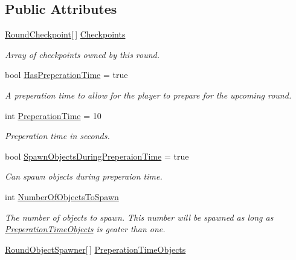 \subsection*{Public Attributes}
\begin{DoxyCompactItemize}
\item 
\hyperlink{class_round_manager_1_1_round_checkpoint}{Round\+Checkpoint}\mbox{[}$\,$\mbox{]} \hyperlink{class_round_manager_1_1_round_ae4903232675603b581af91af5e42ad58}{Checkpoints}
\begin{DoxyCompactList}\small\item\em Array of checkpoints owned by this round. \end{DoxyCompactList}\item 
bool \hyperlink{class_round_manager_1_1_round_a711e1825e6d269ab0308a79cf25ee8d1}{Has\+Preperation\+Time} = true
\begin{DoxyCompactList}\small\item\em A preperation time to allow for the player to prepare for the upcoming round. \end{DoxyCompactList}\item 
int \hyperlink{class_round_manager_1_1_round_a5a70ef04a60e0aeddaf1cd1898a419e5}{Preperation\+Time} = 10
\begin{DoxyCompactList}\small\item\em Preperation time in seconds. \end{DoxyCompactList}\item 
bool \hyperlink{class_round_manager_1_1_round_a9c32b59e081626bb406a85caeb2a3cf4}{Spawn\+Objects\+During\+Preperaion\+Time} = true
\begin{DoxyCompactList}\small\item\em Can spawn objects during preperaion time. \end{DoxyCompactList}\item 
int \hyperlink{class_round_manager_1_1_round_ae42e5ac4d526b13e552f1b24e5a83a19}{Number\+Of\+Objects\+To\+Spawn}
\begin{DoxyCompactList}\small\item\em The number of objects to spawn. This number will be spawned as long as \hyperlink{class_round_manager_1_1_round_a1e58477543ce08f5fd2a436ebadbcc7c}{Preperation\+Time\+Objects} is geater than one. \end{DoxyCompactList}\item 
\hyperlink{class_round_object_spawner}{Round\+Object\+Spawner}\mbox{[}$\,$\mbox{]} \hyperlink{class_round_manager_1_1_round_a1e58477543ce08f5fd2a436ebadbcc7c}{Preperation\+Time\+Objects}

\end{DoxyCompactItemize}
